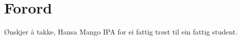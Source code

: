 \chapter*{Forord}
\thispagestyle{fancy}
Ønskjer å takke, Hansa Mango IPA for ei fattig trøst til ein fattig student.


\thispagestyle{empty}